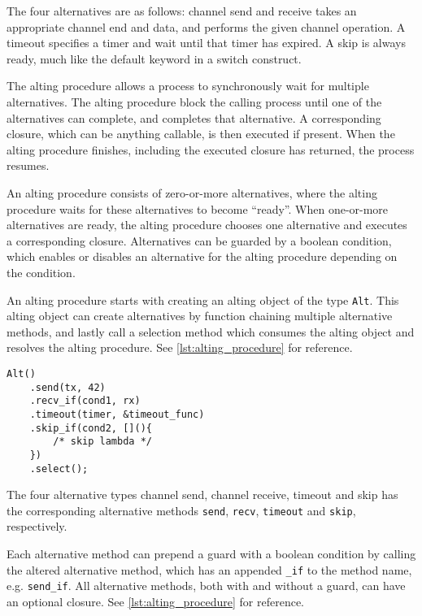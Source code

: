 The four alternatives are as follows: channel send and receive takes an appropriate channel end and data, and performs the given channel operation. A timeout specifies a timer and wait until that timer has expired. A skip is always ready, much like the default keyword in a switch construct. 

The alting procedure allows a process to synchronously wait for multiple alternatives. The alting procedure block the calling process until one of the alternatives can complete, and completes that alternative. A corresponding closure, which can be anything callable, is then executed if present. When the alting procedure finishes, including the executed closure has returned, the process resumes.

An alting procedure consists of zero\hyp{}or\hyp{}more alternatives, where the alting procedure waits for these alternatives to become ``ready''. When one\hyp{}or\hyp{}more alternatives are ready, the alting procedure chooses one alternative and executes a corresponding closure. Alternatives can be guarded by a boolean condition, which enables or disables an alternative for the alting procedure depending on the condition.

An alting procedure starts with creating an alting object of the type \lstinline[style={CustomC++}]|Alt|. This alting object can create alternatives by function chaining multiple alternative methods, and lastly call a selection method which consumes the alting object and resolves the alting procedure. See \cref{lst:alting_procedure} for reference.

\begin{lstfloat}
\begin{lstlisting}[caption={Example of the alting construct.}, label={lst:alting_procedure}, style={CustomC++}, xleftmargin={2em}]
Alt()
    .send(tx, 42)
    .recv_if(cond1, rx)
    .timeout(timer, &timeout_func)
    .skip_if(cond2, [](){
        /* skip lambda */
    })
    .select();
\end{lstlisting}
\end{lstfloat}

The four alternative types channel send, channel receive, timeout and skip has the corresponding alternative methods \lstinline[style={CustomC++}]|send|, \lstinline[style={CustomC++}]|recv|, \lstinline[style={CustomC++}]|timeout| and \lstinline[style={CustomC++}]|skip|, respectively. 

Each alternative method can prepend a guard with a boolean condition by calling the altered alternative method, which has an appended \lstinline[style={CustomC++}]|_if| to the method name, e.g. \lstinline[style={CustomC++}]|send_if|. All alternative methods, both with and without a guard, can have an optional closure. See \cref{lst:alting_procedure} for reference.

